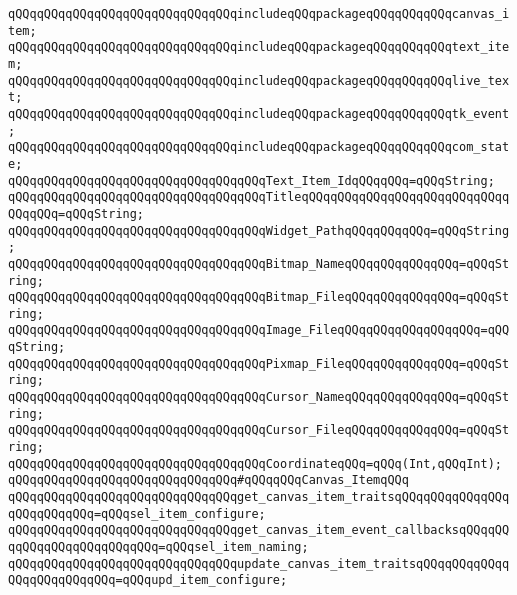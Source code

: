 \verb|qQQqqQQqqQQqqQQqqQQqqQQqqQQqqQQqincludeqQQqpackageqQQqqQQqqQQqcanvas_item;|\newline
\verb|qQQqqQQqqQQqqQQqqQQqqQQqqQQqqQQqincludeqQQqpackageqQQqqQQqqQQqtext_item;|\newline
\verb|qQQqqQQqqQQqqQQqqQQqqQQqqQQqqQQqincludeqQQqpackageqQQqqQQqqQQqlive_text;|\newline
\verb|qQQqqQQqqQQqqQQqqQQqqQQqqQQqqQQqincludeqQQqpackageqQQqqQQqqQQqtk_event;|\newline
\verb|qQQqqQQqqQQqqQQqqQQqqQQqqQQqqQQqincludeqQQqpackageqQQqqQQqqQQqcom_state;|\newline
\newline
\verb|qQQqqQQqqQQqqQQqqQQqqQQqqQQqqQQqqQQqText_Item_IdqQQqqQQq=qQQqString;|\newline
\verb|qQQqqQQqqQQqqQQqqQQqqQQqqQQqqQQqqQQqTitleqQQqqQQqqQQqqQQqqQQqqQQqqQQqqQQqqQQq=qQQqString;|\newline
\verb|qQQqqQQqqQQqqQQqqQQqqQQqqQQqqQQqqQQqWidget_PathqQQqqQQqqQQq=qQQqString;|\newline
\newline
\verb|qQQqqQQqqQQqqQQqqQQqqQQqqQQqqQQqqQQqBitmap_NameqQQqqQQqqQQqqQQq=qQQqString;|\newline
\verb|qQQqqQQqqQQqqQQqqQQqqQQqqQQqqQQqqQQqBitmap_FileqQQqqQQqqQQqqQQq=qQQqString;|\newline
\verb|qQQqqQQqqQQqqQQqqQQqqQQqqQQqqQQqqQQqImage_FileqQQqqQQqqQQqqQQqqQQq=qQQqString;|\newline
\verb|qQQqqQQqqQQqqQQqqQQqqQQqqQQqqQQqqQQqPixmap_FileqQQqqQQqqQQqqQQq=qQQqString;|\newline
\verb|qQQqqQQqqQQqqQQqqQQqqQQqqQQqqQQqqQQqCursor_NameqQQqqQQqqQQqqQQq=qQQqString;|\newline
\verb|qQQqqQQqqQQqqQQqqQQqqQQqqQQqqQQqqQQqCursor_FileqQQqqQQqqQQqqQQq=qQQqString;|\newline
\newline
\verb|qQQqqQQqqQQqqQQqqQQqqQQqqQQqqQQqqQQqCoordinateqQQq=qQQq(Int,qQQqInt);|\newline
\newline
\verb|qQQqqQQqqQQqqQQqqQQqqQQqqQQqqQQq#qQQqqQQqCanvas_ItemqQQq|\newline
\verb|qQQqqQQqqQQqqQQqqQQqqQQqqQQqqQQqget_canvas_item_traitsqQQqqQQqqQQqqQQqqQQqqQQqqQQq=qQQqsel_item_configure;|\newline
\verb|qQQqqQQqqQQqqQQqqQQqqQQqqQQqqQQqget_canvas_item_event_callbacksqQQqqQQqqQQqqQQqqQQqqQQqqQQq=qQQqsel_item_naming;|\newline
\verb|qQQqqQQqqQQqqQQqqQQqqQQqqQQqqQQqupdate_canvas_item_traitsqQQqqQQqqQQqqQQqqQQqqQQqqQQq=qQQqupd_item_configure;|\newline
